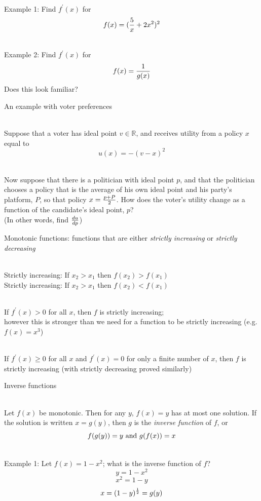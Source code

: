 \documentclass[10pt]{seminar}
\begin{document}
\begin{slide}
\ \\Example 1: Find $f^\prime(x)$ for $$f(x)=({5\over x}+2x^2)^2$$ 

\ \\Example 2: Find $f^\prime(x)$ for   $$f(x)={1\over{g(x)}}$$ Does this look familiar?

\newslide

An example with voter preferences

\ \\Suppose that a voter has ideal point $v\in \mathbb{R}$, and receives utility from a policy $x$ equal to $$u(x)=-(v-x)^2$$

\ \\Now suppose that there is a politician with ideal point $p$, and that the politician chooses a policy that is the average of his own ideal point and his party's platform, $P$, so that policy $x={{p+P}\over 2}$.  How does the voter's utility change as a function of the candidate's ideal point, $p$? \\(In other words, find ${du}\over {dp}$)

\newslide

Monotonic functions: functions that are either \textit{strictly increasing} or \textit{strictly decreasing}

\ \\Strictly increasing: If $x_2>x_1$ then $f(x_2)>f(x_1)$
\ \\Strictly increasing: If $x_2>x_1$ then $f(x_2)<f(x_1)$


\ \\If $f^\prime(x)>0$ for all $x$, then $f$ is strictly increasing; \\however this is stronger than we need for a function to be strictly increasing (e.g. $f(x)=x^3$)

\ \\If $f^\prime(x)\geq 0$ for all $x$ and $f^\prime(x)=0$ for only a finite number of $x$, then $f$ is strictly increasing (with strictly decreasing proved similarly)

\newslide
Inverse functions

\ \\Let $f(x)$ be monotonic.  Then for any $y$, $f(x)=y$ has at most one solution. If the solution is written $x=g(y)$, then $g$ is the \textit{inverse function} of $f$, or $$f(g(y))=y \hbox{ and }g(f(x))=x$$


\ \\Example 1:  Let $f(x)=1-x^2$; what is the inverse function of $f$? 
$$y=1-x^2$$
$$x^2=1-y$$
$$x=(1-y)^{1\over 2} = g(y)$$


\end{slide}
\end{document}
